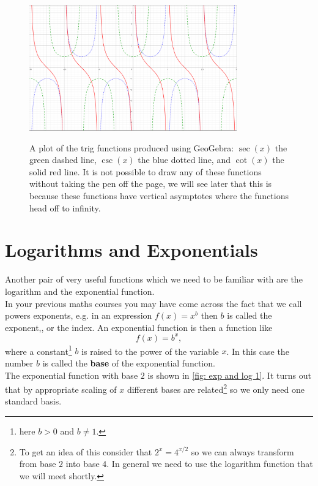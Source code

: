 \begin{figure}[ht]
    \centering
  \includegraphics[width=0.8\textwidth, alt ={Graphs of sec(x), csc(x), and cot(x).}]{figures/sec-cot-csc-fig}
    \caption{A plot of the trig functions produced using GeoGebra: $\sec(x)$ the green dashed line, $\csc(x)$ the blue dotted line, and $\cot(x)$ the solid red line. It is not possible to draw any of these functions without taking the pen off the page, we will see later that this is because these functions have vertical asymptotes where the functions head off to infinity.  }
\label{fig: sec function}
\end{figure}

\section{Logarithms and Exponentials}
\label{sec: log and exp}

Another pair of very useful functions which we need to be familiar with are the logarithm and the exponential function. \\

In your previous maths courses you may have come across the fact that we call powers exponents, e.g. in an expression $f(x)=x^{b}$ then $b$ is called the exponent,, or the index. An exponential function is then a function like
\begin{equation*}
f(x)=b^{x},
\end{equation*}
where a constant\footnote{here $b>0$ and $b\neq 1$.} $b$ is raised to the power of the variable $x$. In this case the number $b$ is called the \textbf{\gls{base}} of the exponential function.\\

The exponential function with base $2$ is shown in \cref{fig: exp and log 1}.  It turns out that by appropriate scaling of $x$ different bases are related\footnote{To get an idea of this consider that $2^{x}=4^{x/2}$ so we can always transform from base $2$ into base $4$. In general we need to use the logarithm function that we will meet shortly.} so we only need one standard basis. \\

